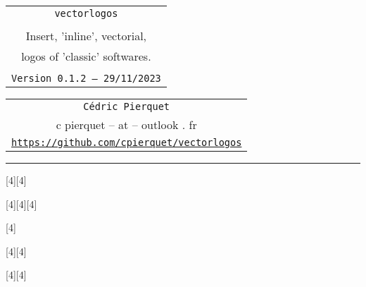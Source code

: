 \documentclass[11pt,a4paper]{ltxdoc}
\def\TPversion{0.1.2}
\def\TPdate{29/11/2023}
\begin{document}
\pagestyle{fancy}

\thispagestyle{empty}

\begin{center}
	\begin{minipage}{0.88\linewidth}
	\begin{tcolorbox}[colframe=yellow,colback=yellow!15]
		\begin{center}
			\begin{tabular}{c}
				{\Huge \texttt{vectorlogos}}\\
				\\
				{\LARGE Insert, 'inline', vectorial,} \\
				{\LARGE logos of 'classic' softwares.} \\
				\\
				{\small \texttt{Version \TPversion{} -- \TPdate}}
		\end{tabular}
		\end{center}
	\end{tcolorbox}
\end{minipage}
\end{center}

\begin{center}
	\begin{tabular}{c}
	\texttt{Cédric Pierquet}\\
	{\ttfamily c pierquet -- at -- outlook . fr}\\
	\texttt{\url{https://github.com/cpierquet/vectorlogos}} \\
\end{tabular}
\end{center}

\hrule

\vfill

\begin{tcolorbox}[colframe=lightgray,colback=lightgray!5]
\begin{center}
\scalebox{4}[4]{\logogeogebra}\hspace{1cm}\scalebox{4}[4]{\logogeogebra[icon]}

\medskip

\scalebox{4}[4]{\logoscratch}\hspace{1cm}\scalebox{4}[4]{\logoscratch[alt]}\hspace{1cm}\scalebox{4}[4]{\logoscratch[cat]}

\medskip

\scalebox{4}[4]{\logotexstudio}

\medskip

\scalebox{4}[4]{\logoemacs}\hspace{1cm}\scalebox{4}[4]{\logoemacs[alt]}

\medskip

\scalebox{4}[4]{\logotexmaker}\hspace{1cm}\scalebox{4}[4]{\logotexmaker[alt]}
\end{center}
\end{tcolorbox}
\end{document}

